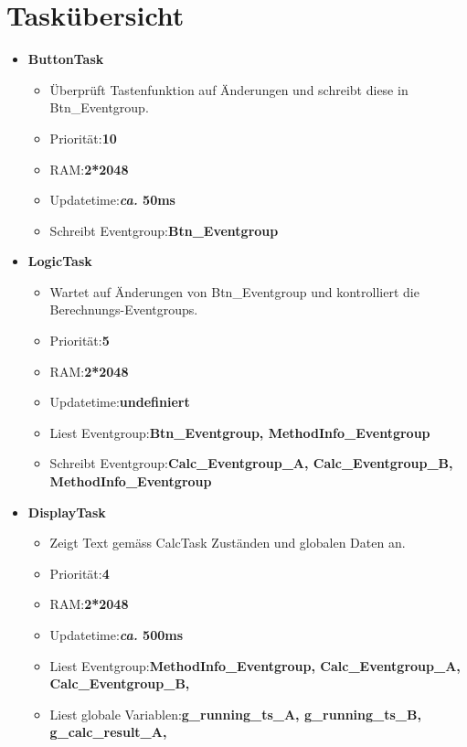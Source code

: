 \documentclass[ngerman,10pt,a4paper,titlepage]{report}
\begin{document}
	\section{Taskübersicht}
	\singlespacing
	\begin{itemize}
		\item {\large \textbf{ButtonTask}}
		\begin{itemize}
			\item Überprüft Tastenfunktion auf Änderungen und schreibt diese in Btn\_Eventgroup.
			\item Priorität:\tabto{5cm}\textbf{10}
			\item RAM:\tabto{5cm}\textbf{2*2048}
			\item Updatetime:\tabto{5cm}\textbf{\textit{ca.} 50ms}
			\item Schreibt Eventgroup:\tabto{5cm}\textbf{Btn\_Eventgroup}
		\end{itemize}
		\item {\large \textbf{LogicTask}}
		\begin{itemize}
			\item Wartet auf Änderungen von Btn\_Eventgroup und kontrolliert die Berechnungs-Eventgroups.
			\item Priorität:\tabto{5cm}\textbf{5}
			\item RAM:\tabto{5cm}\textbf{2*2048}
			\item Updatetime:\tabto{5cm}\textbf{undefiniert}
			\item Liest Eventgroup:\tabto{5cm}\textbf{Btn\_Eventgroup, MethodInfo\_Eventgroup}
			\item Schreibt Eventgroup:\tabto{5cm}\textbf{Calc\_Eventgroup\_A, Calc\_Eventgroup\_B,\\
				\tabto{5cm}MethodInfo\_Eventgroup}
		\end{itemize}
		\item {\large \textbf{DisplayTask}}
		\begin{itemize}
			\item Zeigt Text gemäss CalcTask Zuständen und globalen Daten an.
			\item Priorität:\tabto{5cm}\textbf{4}
			\item RAM:\tabto{5cm}\textbf{2*2048}
			\item Updatetime:\tabto{5cm}\textbf{\textit{ca.} 500ms}
			\item Liest Eventgroup:\tabto{5cm}\textbf{MethodInfo\_Eventgroup, Calc\_Eventgroup\_A,\\
				\tabto{5cm}Calc\_Eventgroup\_B,}
			\item Liest globale Variablen:\tabto{5cm}\textbf{g\_running\_ts\_A, g\_running\_ts\_B, g\_calc\_result\_A,\\
}
\end{itemize}
\end{itemize}
\end{document}
